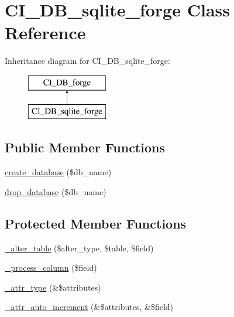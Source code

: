 \hypertarget{class_c_i___d_b__sqlite__forge}{}\section{C\+I\+\_\+\+D\+B\+\_\+sqlite\+\_\+forge Class Reference}
\label{class_c_i___d_b__sqlite__forge}
Inheritance diagram for C\+I\+\_\+\+D\+B\+\_\+sqlite\+\_\+forge\+:\begin{figure}[H]
\begin{center}
\leavevmode
\includegraphics[height=2.000000cm]{class_c_i___d_b__sqlite__forge}
\end{center}
\end{figure}
\subsection*{Public Member Functions}
\begin{DoxyCompactItemize}
\item 
\mbox{\hyperlink{class_c_i___d_b__sqlite__forge_a167b7e739a45c9620df00e339ef5a559}{create\+\_\+database}} (\$db\+\_\+name)
\item 
\mbox{\hyperlink{class_c_i___d_b__sqlite__forge_a2a78fe3cc9de111bd2aa8d7cc207acf8}{drop\+\_\+database}} (\$db\+\_\+name)
\end{DoxyCompactItemize}
\subsection*{Protected Member Functions}
\begin{DoxyCompactItemize}
\item 
\mbox{\hyperlink{class_c_i___d_b__sqlite__forge_aa3711cb3973739f5b3665969da1bf649}{\+\_\+alter\+\_\+table}} (\$alter\+\_\+type, \$table, \$field)
\item 
\mbox{\hyperlink{class_c_i___d_b__sqlite__forge_a9ec74d1673dbed86f95be560e5d29e96}{\+\_\+process\+\_\+column}} (\$field)
\item 
\mbox{\hyperlink{class_c_i___d_b__sqlite__forge_a0a3e901e15f6fe71900cdfc30e86638f}{\+\_\+attr\+\_\+type}} (\&\$attributes)
\item 
\mbox{\hyperlink{class_c_i___d_b__sqlite__forge_a28232acc5087981afe58a45ccfdd2571}{\+\_\+attr\+\_\+auto\+\_\+increment}} (\&\$attributes, \&\$field)
\end{DoxyCompactItemize}
